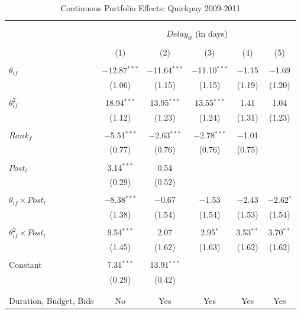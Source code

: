 \documentclass[
]{article}
\begin{document}
\begin{table}[H] \centering 
  \caption{Continuous Portfolio Effects: Quickpay 2009-2011} 
  \label{} 
\small 
\begin{tabular}{@{\extracolsep{-2pt}}lccccc} 
\\[-1.8ex]\hline 
\hline \\[-1.8ex] 
\\[-1.8ex] & \multicolumn{5}{c}{$Delay_{it}$ (in days)} \\ 
\\[-1.8ex] & (1) & (2) & (3) & (4) & (5)\\ 
\hline \\[-1.8ex] 
 $\theta_{if}$ & $-$12.87$^{***}$ & $-$11.64$^{***}$ & $-$11.10$^{***}$ & $-$1.15 & $-$1.69 \\ 
  & (1.06) & (1.15) & (1.15) & (1.19) & (1.20) \\ 
  & & & & & \\ 
 $\theta_{if}^2$ & 18.94$^{***}$ & 13.95$^{***}$ & 13.55$^{***}$ & 1.41 & 1.04 \\ 
  & (1.12) & (1.23) & (1.24) & (1.31) & (1.23) \\ 
  & & & & & \\ 
 $Rank_f$ & $-$5.51$^{***}$ & $-$2.63$^{***}$ & $-$2.78$^{***}$ & $-$1.01 &  \\ 
  & (0.77) & (0.76) & (0.76) & (0.75) &  \\ 
  & & & & & \\ 
 $Post_t$ & 3.14$^{***}$ & 0.54 &  &  &  \\ 
  & (0.29) & (0.52) &  &  &  \\ 
  & & & & & \\ 
 $\theta_{if} \times Post_t$ & $-$8.38$^{***}$ & $-$0.67 & $-$1.53 & $-$2.43 & $-$2.62$^{*}$ \\ 
  & (1.38) & (1.54) & (1.54) & (1.53) & (1.54) \\ 
  & & & & & \\ 
 $\theta_{if}^2 \times Post_t$ & 9.54$^{***}$ & 2.07 & 2.95$^{*}$ & 3.53$^{**}$ & 3.70$^{**}$ \\ 
  & (1.45) & (1.62) & (1.63) & (1.62) & (1.62) \\ 
  & & & & & \\ 
 Constant & 7.31$^{***}$ & 13.91$^{***}$ &  &  &  \\ 
  & (0.29) & (0.42) &  &  &  \\ 
  & & & & & \\ 
\hline \\[-1.8ex] 
Duration, Budget, Bids & No & Yes & Yes & Yes & Yes \\ 

\end{tabular}
\end{table}
\end{document}
